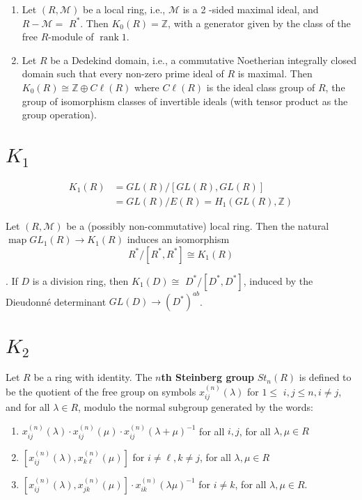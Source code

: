 \begin{prop}
    \begin{enumerate}
        \item Let $(R, \mathcal{M})$ be a local ring, i.e., $\mathcal{M}$ is a 2 -sided maximal ideal, and $R-\mathcal{M}=$ $R^*$. Then $K_0(R)=\mathbb{Z}$, with a generator given by the class of the free $R$-module of $\operatorname{rank} 1$.
        \item Let $R$ be a Dedekind domain, i.e., a commutative Noetherian integrally closed domain such that every non-zero prime ideal of $R$ is maximal. Then $K_0(R) \cong \mathbb{Z} \oplus C \ell(R)$ where $C \ell(R)$ is the ideal class group of $R$, the group of isomorphism classes of invertible ideals (with tensor product as the group operation).
    \end{enumerate}
\end{prop}

\section{$K_1$}


$$\begin{aligned} K_1(R) & =G L(R) /[G L(R), G L(R)] \\ & =G L(R) / E(R)=H_1(G L(R), \mathbb{Z})\end{aligned}$$


\begin{prop}
Let $(R, \mathcal{M})$ be a (possibly non-commutative) local ring. Then the natural $\operatorname{map} G L_1(R) \rightarrow K_1(R)$ induces an isomorphism
    $$
    R^* /\left[R^*, R^*\right] \cong K_1(R)
    $$    
\end{prop}

\begin{coro}
[Dieudonné]. If $D$ is a division ring, then $K_1(D) \cong$ $D^* /\left[D^*, D^*\right]$, induced by the Dieudonné determinant $G L(D) \rightarrow\left(D^*\right)^{a b}$.    
\end{coro}



\section{$K_2$}

Let $R$ be a ring with identity. The \textbf{$n$th Steinberg group} $S t_n(R)$ is defined to be the quotient of the free group on symbols $x_{i j}^{(n)}(\lambda)$ for $1 \leq$ $i, j \leq n, i \neq j$, and for all $\lambda \in R$, modulo the normal subgroup generated by the words:
\begin{enumerate}
    \item $x_{i j}^{(n)}(\lambda) \cdot x_{i j}^{(n)}(\mu) \cdot x_{i j}^{(n)}(\lambda+\mu)^{-1}$ for all $i, j$, for all $\lambda, \mu \in R$
    \item $\left[x_{i j}^{(n)}(\lambda), x_{k \ell}^{(n)}(\mu)\right]$ for $i \neq \ell, k \neq j$, for all $\lambda, \mu \in R$
    \item $\left[x_{i j}^{(n)}(\lambda), x_{j k}^{(n)}(\mu)\right] \cdot x_{i k}^{(n)}(\lambda \mu)^{-1}$ for $i \neq k$, for all $\lambda, \mu \in R$.
\end{enumerate} %

